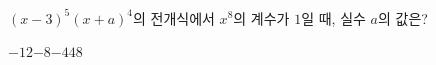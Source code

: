 $(x-3)^5(x+a)^4$의 전개식에서 $x^8$의 계수가 $1$일 때, 실수 $a$의 값은?
\begin{choices32}{$-12$}{$-8$}{$-4$}{$4$}{$8$}\end{choices32}
